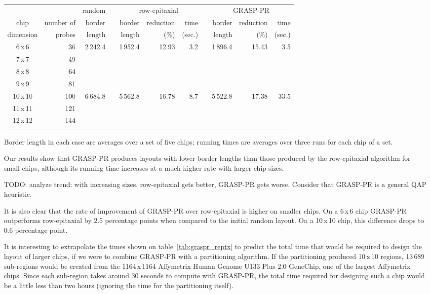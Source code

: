 \documentclass{bioinfo}
\begin{document}
\begin{table*}[t]
{\begin{tabular}{crrcrrrcrrr} \toprule
          &            & random & & \multicolumn{3}{c}{row-epitaxial}  & & \multicolumn{3}{c}{GRASP-PR}  \\ \cline{3-3} \cline{5-7} \cline{9-11}
chip      & number of  & border & & border & reduction & time          & & border & reduction & time   \\
dimension & probes     & length & & length & (\%)      & (sec.)        & & length & (\%)      & (sec.) \\ \midrule
6\,x\,6 & 36 & 2\,242.4 & & 1\,952.4 & 12.93 & 3.2 & & 1\,896.4 & 15.43 & 3.5 \\
7\,x\,7 & 49 & & & & & & & & & \\
8\,x\,8 & 64 & & & & & & & & & \\
9\,x\,9 & 81 & & & & & & & & & \\
10\,x\,10 & 100 & 6\,684.8 & & 5\,562.8 & 16.78 & 8.7 & & 5\,522.8 & 17.38 & 33.5 \\
11\,x\,11 & 121 & & & & & & & & & \\
12\,x\,12 & 144 & & & & & & & & & \\ \botrule
\end{tabular}}{Border length in each case are averages over a set of five chips; running times are averages over three runs for each chip of a set.}
\end{table*}

Our results show that GRASP-PR produces layouts with lower border lengths than those produced by the row-epitaxial algorithm for small chips, although its running time increases at a much higher rate with larger chip sizes.

TODO: analyze trend: with increasing sizes, row-epitaxial gets better, GRASP-PR gets worse. Consider that GRASP-PR is a general QAP heuristic.

It is also clear that the rate of improvement of GRASP-PR over row-epitaxial is higher on smaller chips. On a 6\,x\,6 chip GRASP-PR outperforms row-epitaxial by $2.5$ percentage points when compared to the initial random layout. On a 10\,x\,10 chip, this difference drops to $0.6$ percentage point.

It is interesting to extrapolate the times shown on table~\ref{tab:graspr_reptx} to predict the total time that would be required to design the layout of larger chips, if we were to combine GRASP-PR with a partitioning algorithm. If the partitioning produced 10\,x\,10 regions, 13\,689 sub-regions would be created from the 1164\,x\,1164 Affymetrix Human Genome U133 Plus 2.0 GeneChip\raisebox{.6ex}{\scriptsize \textregistered}, one of the largest Affymetrix chips. Since each sub-region takes around 30 seconds to compute with GRASP-PR, the total time required for designing such a chip would be a little less than two hours (ignoring the time for the partitioning itself).
\end{document}
